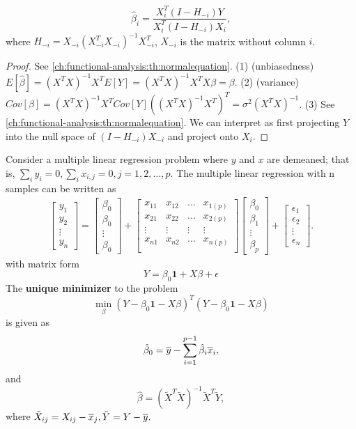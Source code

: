 \begin{refsection}
\begin{theorem}
\begin{itemize}
		$$\hat{\beta}_i = \frac{X_i^T(I - H_{-i})Y}{X_i^T(I-H_{-i})X_i},$$
		where $H_{-i} = X_{-i}(X_{-i}^TX_{-i})^{-1} X_{-i}^T$, $X_{-i}$ is the matrix without column $i$.
	\end{itemize}
\end{theorem}
\begin{proof}
	See \autoref{ch:functional-analysis:th:normalequation}.
	(1) (unbiasedness) $E[\hat{\beta}] = (X^TX)^{-1}X^T E[Y] = (X^TX)^{-1}X^TX\beta = \beta.$
	(2) (variance) $Cov[\beta] = (X^TX)^{-1}X^TCov[Y]((X^TX)^{-1}X^T)^T = \sigma^2(X^TX)^{-1}$.
	(3) See \autoref{ch:functional-analysis:th:normalequation}. We can interpret as first projecting $Y$ into the null space of $(I-H_{-i})X_{-i}$ and project onto $X_i$. 
\end{proof}

\begin{theorem}\label{ch:statistical-models:th:leastSquareSolutionDemeanCase}
Consider a multiple linear regression problem where $y$ and $x$ are demeaned; that is, $\sum_i y_i = 0, \sum_{i}x_{i,j} = 0, j=1,2,...,p$. 	The multiple linear regression with n samples can be written as
\begin{align*}
\begin{bmatrix}
y_1\\
y_2\\
\vdots\\
y_n
\end{bmatrix} = \begin{bmatrix}
\beta_0\\
\beta_0\\
\vdots\\
\beta_0
\end{bmatrix}+\begin{bmatrix}
x_{11} & x_{12} & \dots & x_{1(p)}\\
x_{21} & x_{22} & \dots & x_{2(p)}\\
\vdots & \vdots & \vdots & \vdots \\
x_{n1} & x_{n2} & \dots & x_{n(p)}\\
\end{bmatrix}
\begin{bmatrix}
\beta_0\\
\beta_1\\
\vdots\\
\beta_{p}
\end{bmatrix}
+ \begin{bmatrix}
\epsilon_1\\
\epsilon_2\\
\vdots\\
\epsilon_{n}
\end{bmatrix}.
\end{align*}
	with matrix form
	$$Y = \beta_0\bm{1} + X\beta + \epsilon$$
	The \textbf{unique minimizer} to the problem 
	$$\min_\beta (Y-\beta_0\bm{1} -X\beta)^T(Y - \beta_0\bm{1} - X\beta)$$
	is given as
	$$\hat{\beta}_0 = \overline{y} - \sum_{i=1}^{p-1} \hat{\beta}_i \overline{x}_i,$$
	and
	$$\hat{\beta} = (\tilde{X}^T\tilde{X})^{-1}\tilde{X}^T\tilde{Y},$$
	where $\tilde{X}_{ij} = X_{ij} - \overline{x}_j, \tilde{Y} = Y - \overline{y}.$
	

\end{theorem}
\end{refsection}
